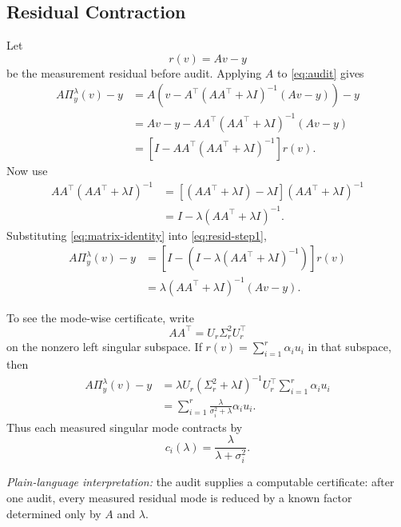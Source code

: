 \documentclass[journal]{IEEEtran}
\newcommand{\Audit}{\Pi_y^\lambda}
\begin{document}
\subsection{Residual Contraction}

Let
\begin{equation}
    r(v)=Av-y
\end{equation}
be the measurement residual before audit.  Applying $A$ to \eqref{eq:audit} gives
\begin{align}
    A\Audit(v)-y
    &= A\left(v-A^\top(AA^\top+\lambda I)^{-1}(Av-y)\right)-y\\
    &= Av-y-AA^\top(AA^\top+\lambda I)^{-1}(Av-y)\\
    &= \left[I-AA^\top(AA^\top+\lambda I)^{-1}\right]r(v).
    \label{eq:resid-step1}
\end{align}
Now use
\begin{align}
    AA^\top(AA^\top+\lambda I)^{-1}
    &= \left[(AA^\top+\lambda I)-\lambda I\right](AA^\top+\lambda I)^{-1}\\
    &= I-\lambda(AA^\top+\lambda I)^{-1}.
    \label{eq:matrix-identity}
\end{align}
Substituting \eqref{eq:matrix-identity} into \eqref{eq:resid-step1},
\begin{align}
    A\Audit(v)-y
    &= \left[I-\left(I-\lambda(AA^\top+\lambda I)^{-1}\right)\right]r(v)\\
    &= \lambda(AA^\top+\lambda I)^{-1}(Av-y).
    \label{eq:contraction-main}
\end{align}

To see the mode-wise certificate, write
\begin{equation}
    AA^\top = U_r\Sigma_r^2 U_r^\top
\end{equation}
on the nonzero left singular subspace.  If $r(v)=\sum_{i=1}^r \alpha_i u_i$ in that subspace, then
\begin{align}
    A\Audit(v)-y
    &= \lambda U_r(\Sigma_r^2+\lambda I)^{-1}U_r^\top
       \sum_{i=1}^r \alpha_i u_i\\
    &= \sum_{i=1}^r
       \frac{\lambda}{\sigma_i^2+\lambda}\alpha_i u_i.
    \label{eq:mode-contraction}
\end{align}
Thus each measured singular mode contracts by
\begin{equation}
    c_i(\lambda)=\frac{\lambda}{\lambda+\sigma_i^2}.
    \label{eq:mode-factor}
\end{equation}

\textit{Plain-language interpretation:} the audit supplies a computable certificate: after one audit, every measured residual mode is reduced by a known factor determined only by $A$ and $\lambda$.
\end{document}
